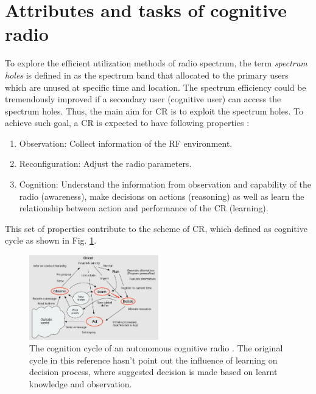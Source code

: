 \documentclass[journal]{IEEEtran}
\begin{document}
\section{Attributes and tasks of cognitive radio}
To explore the efficient utilization methods of radio spectrum, the term \textsl{spectrum holes} is defined in \cite{haykin2005cognitive} as the spectrum band that allocated to the primary users which are unused at specific time and location. The spectrum efficiency could be tremendously improved if a secondary user (cognitive user) can access the spectrum holes. Thus, the main aim for CR is to exploit the spectrum holes. To achieve such goal, a CR is expected to have following properties \cite{he2010survey}:
\begin{enumerate}
  \item Observation: Collect information of the RF environment.
  \item Reconfiguration: Adjust the radio parameters.
  \item Cognition: Understand the information from observation and capability of
the radio (awareness), make decisions on actions (reasoning) as well as learn the relationship between action and performance of the CR (learning).
\end{enumerate}

This set of properties contribute to the scheme of CR, which defined as cognitive cycle \cite{mitola1999cognitive} as shown in Fig. \ref{CognitiveCycle}.
\begin{figure}[!t]
  \centering
  \includegraphics[width=0.5\textwidth]{cogCycle.jpeg}
  \caption{The cognition cycle of an autonomous cognitive radio \cite{mitola1999cognitive}. The original cycle in this reference hasn't point out the influence of learning on decision process, where \cite{jayaweera2011radiobots} suggested decision is made based on learnt knowledge and observation.}
  \label{CognitiveCycle}
\end{figure}
\end{document}
